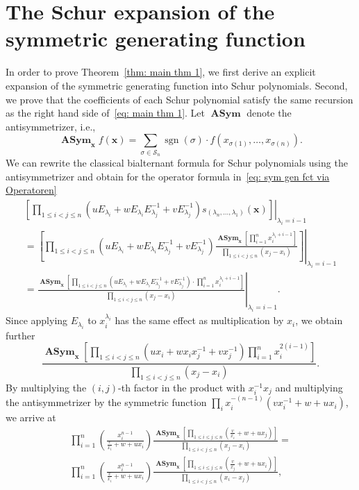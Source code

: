 \documentclass[11pt]{article}
\theoremstyle{definition}
\numberwithin{equation}{section}
\newcommand{\x}{\mathbf{x}}
\DeclareMathOperator{\sgn}{sgn}
\DeclareMathOperator{\asym}{\mathbf{ASym}}
\newcounter{x}
\newcounter{y}
\newcounter{z}
\begin{document}
\section{The Schur expansion of the symmetric generating function}
\label{sec: proof of mt 1}

In order to prove Theorem~\ref{thm: main thm 1}, we first derive an explicit expansion of the symmetric generating function into Schur polynomials. Second, we prove that the coefficients of each Schur polynomial satisfy the same recursion as the right hand side of~\eqref{eq: main thm 1}.
Let $\asym$ denote the antisymmetrizer, i.e.,
\[
\asym_{\x}  f(\mathbf{x}) = \sum\limits_{\sigma \in {\mathcal S}_n} \sgn(\sigma) \allowbreak \cdot f(x_{\sigma(1)},\ldots,x_{\sigma(n)})
.
\] 
We can rewrite the classical bialternant formula for Schur polynomials using the antisymmetrizer and obtain for the operator formula in~\eqref{eq: sym gen fct via Operatoren}
\begin{multline*}
 \left. \left[ \prod_{1 \leq i < j \leq n} \left(u E_{\lambda_i}  + w E_{\lambda_i}E_{\lambda_j}^{-1} +  v E_{\lambda_j}^{-1}  \right) s_{(\lambda_n,\ldots,\lambda_1)}(\x) \right] \right|_{\lambda_i=i-1} \\
=  \left. \left[ \prod_{1 \leq i < j \leq n} \left(u E_{\lambda_i}  + w E_{\lambda_i}E_{\lambda_j}^{-1} +  v E_{\lambda_j}^{-1}  \right) \frac{\asym_\x \left[\prod\limits_{i=1}^n x_i^{\lambda_i+i-1}\right]}{\prod\limits_{1 \leq i < j \leq n}(x_j-x_i)} \right] \right|_{\lambda_i=i-1} \\
=  \left.  \frac{\asym_\x \left[\prod\limits_{1 \leq i < j \leq n} \left(u E_{\lambda_i}  + w E_{\lambda_i}E_{\lambda_j}^{-1} +  v E_{\lambda_j}^{-1}  \right) \cdot \prod\limits_{i=1}^n x_i^{\lambda_i+i-1}\right]}{\prod\limits_{1 \leq i < j \leq n}(x_j-x_i)} \right|_{\lambda_i=i-1}.
\end{multline*}
Since applying $E_{\lambda_i}$ to  $x_i^{\lambda_i}$ has the same effect as multiplication by $x_i$, we obtain further
\begin{equation}  \frac{\asym_\x \left[
\prod\limits_{1 \leq i < j \leq n} \left(u x_i  + w x_i x_j^{-1} +  v x_j^{-1}  \right) \prod\limits_{i=1}^n x_i^{2(i-1)} \right]}{\prod\limits_{1 \leq i < j \leq n}(x_j-x_i)}. \label{eq: sym gen fct via antisym}
\end{equation} 
 By multiplying the $(i,j)$-th factor in the product with $x_i^{-1} x_j$ and multiplying the antisymmetrizer by the symmetric function $\prod_i x_i^{-(n-1)}(v x_i^{-1}+w+ux_i)$,
  we arrive at
\begin{multline*}
\prod\limits_{i=1}^n \left( \frac{ x_i^{n-1}}{\frac{ v}{x_i} + w + u x_i} \right)
   \frac{ \asym_{\x} 
\left[  \prod\limits_{1 \le i \le  j \le n} \left(\frac{ v}{x_i} + w + u x_j\right) \right]}{ \prod\limits_{1 \le i < j \le n} (x_j - x_i)}
=\\
\prod\limits_{i=1}^n \left( \frac{ x_i^{n-1}}{\frac{ v}{x_i} + w + u x_i} \right)
   \frac{ \asym_{\x} 
\left[  \prod\limits_{1 \le i \le  j \le n} \left(\frac{ v}{x_j} + w + u x_i\right) \right]}{ \prod\limits_{1 \le i < j \le n} (x_i - x_j)},
\end{multline*}
\end{document}
